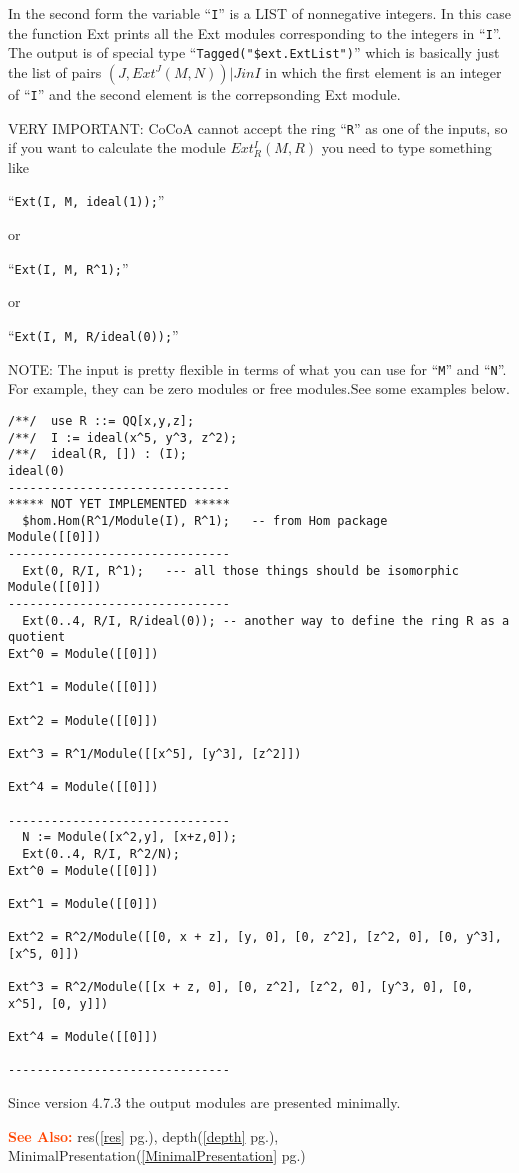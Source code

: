 \documentclass[a4paper]{mybook}
\newenvironment{command}{}{} %
\newcommand\SeeAlso{\par\textcolor{OrangeRed}{\textbf{\large See Also: }}}
\begin{document}
\begin{command}
In the second form the variable ``\verb&I&'' is a LIST of nonnegative
integers. In this case the function Ext prints all the Ext modules
corresponding to the integers in ``\verb&I&''.
The output is of special type ``\verb&Tagged("$ext.ExtList")&'' which is basically
just the list of pairs  ${(J, Ext^J(M, N)) | J in I}$ in
which the first element is an integer of ``\verb&I&'' and the second element is
the correpsonding Ext module.
\par 
VERY IMPORTANT: CoCoA cannot accept  the ring ``\verb&R&'' as one of the inputs,
so if you want to calculate the module $Ext^I_R(M, R)$
you need to type something like
\par 
``\verb&Ext(I, M, ideal(1));&''
\par 
or
\par 
``\verb&Ext(I, M, R^1);&''
\par 
or
\par 
``\verb&Ext(I, M, R/ideal(0));&''
\par 
NOTE: The input is pretty flexible in terms of what you can use for ``\verb&M&''
and ``\verb&N&''.  For example, they can be zero modules or free modules.See some  examples below.
\begin{Verbatim}[label=example, rulecolor=\color{PineGreen}, frame=single]
/**/  use R ::= QQ[x,y,z];
/**/  I := ideal(x^5, y^3, z^2);
/**/  ideal(R, []) : (I);
ideal(0)
-------------------------------
***** NOT YET IMPLEMENTED *****
  $hom.Hom(R^1/Module(I), R^1);   -- from Hom package
Module([[0]])
-------------------------------
  Ext(0, R/I, R^1);   --- all those things should be isomorphic
Module([[0]])
-------------------------------
  Ext(0..4, R/I, R/ideal(0)); -- another way to define the ring R as a quotient
Ext^0 = Module([[0]])

Ext^1 = Module([[0]])

Ext^2 = Module([[0]])

Ext^3 = R^1/Module([[x^5], [y^3], [z^2]])

Ext^4 = Module([[0]])

-------------------------------
  N := Module([x^2,y], [x+z,0]);
  Ext(0..4, R/I, R^2/N);
Ext^0 = Module([[0]])

Ext^1 = Module([[0]])

Ext^2 = R^2/Module([[0, x + z], [y, 0], [0, z^2], [z^2, 0], [0, y^3], [x^5, 0]])

Ext^3 = R^2/Module([[x + z, 0], [0, z^2], [z^2, 0], [y^3, 0], [0, x^5], [0, y]])

Ext^4 = Module([[0]])

-------------------------------
\end{Verbatim}

Since version 4.7.3 the output modules are presented minimally.

\SeeAlso %
  res(\ref{res} pg.\pageref{res}), 
    depth(\ref{depth} pg.\pageref{depth}), 
    MinimalPresentation(\ref{MinimalPresentation} pg.\pageref{MinimalPresentation})
\end{command} %
\end{document}
